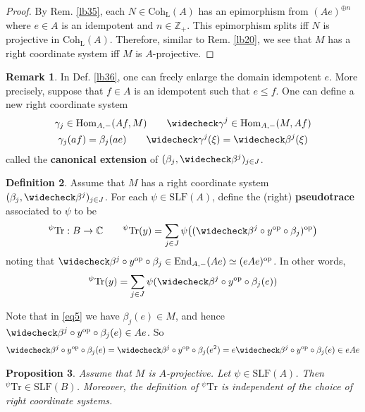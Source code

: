 \documentclass[11pt,b5paper,notitlepage]{article}
\theoremstyle{definition}
\newtheorem{df}{Definition}[section]
\newtheorem{rem}[df]{Remark}
\theoremstyle{plain}
\newtheorem{pp}[df]{Proposition}
\newcommand{\wch}{\widecheck}
\newcommand{\Tr}{\mathrm{Tr}}
\newcommand{\End}{\mathrm{End}} %
\newcommand{\Hom}{\mathrm{Hom}}
\newcommand{\opp}{\mathrm{op}}
\newcommand{\Cbb}{\mathbb C}
\newcommand{\Zbb}{\mathbb Z}
\newcommand{\Coh}{\mathrm{Coh}_{\mathrm L}}
\newcommand{\SLF}{\mathrm{SLF}}
\numberwithin{equation}{section}
\begin{document}
\begin{proof}
By Rem. \ref{lb35}, each  $N\in\Coh(A)$ has an epimorphism from $(Ae)^{\oplus n}$ where $e\in A$ is an idempotent and $n\in\Zbb_+$. This epimorphism splits iff $N$ is projective in $\Coh(A)$. Therefore, similar to Rem. \ref{lb20}, we see that $M$ has a right coordinate system iff $M$ is $A$-projective.
\end{proof}

\begin{rem}
In Def. \ref{lb36}, one can freely enlarge the domain idempotent $e$. More precisely, suppose that $f\in A$ is an idempotent such that $e\leq f$. One can define a new right coordinate system
\begin{gather}\label{eq4}
\begin{gathered}
\gamma_j\in\Hom_{A,-}(Af,M)\qquad \wch\gamma^j\in \Hom_{A,-}(M,Af)\\
\gamma_j(af)=\beta_j(ae)\qquad \wch\gamma^j(\xi)=\wch\beta^j(\xi)
\end{gathered}
\end{gather}
called the  \textbf{canonical extension} of $(\beta_j,\wch\beta^j)_{j\in J}$.
\end{rem}




\begin{df}
Assume that $M$ has a right coordinate system $(\beta_j,\wch\beta^j)_{j\in J}$. For each $\psi\in\SLF(A)$, define the (right) \textbf{pseudotrace} \pmb{${}^\psi\Tr$} associated to $\psi$ to be
\begin{gather*}
{^\psi}\Tr:B\rightarrow\Cbb\qquad
{^\psi}\Tr(y)=\sum_{j\in J}\psi\big((\wch\beta^j\circ y^\opp\circ\beta_j)^\opp\big)
\end{gather*}
noting that $\wch\beta^j\circ y^\opp\circ\beta_j\in\End_{A,-}(Ae)\simeq (eAe)^\opp$. In other words,
\begin{align}\label{eq5}
{^\psi}\Tr(y)=\sum_{j\in J}\psi(\wch\beta^j\circ y^\opp\circ\beta_j(e))
\end{align}
\end{df}

Note that in \eqref{eq5} we have $\beta_j(e)\in M$, and hence $\wch\beta^j\circ y^\opp\circ\beta_j(e)\in Ae$. So
\begin{align*}
\wch\beta^j\circ y^\opp\circ\beta_j(e)=\wch\beta^j\circ y^\opp\circ\beta_j(e^2)=e\wch\beta^j\circ y^\opp\circ\beta_j(e)\in eAe
\end{align*}



\begin{pp}
	Assume that $M$ is $A$-projective. Let $\psi\in\SLF(A)$. Then ${^\psi}\Tr\in\SLF(B)$. Moreover, the definition of ${^\psi}\Tr$ is independent of the choice of right coordinate systems.
\end{pp}
\end{document}
